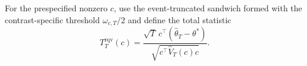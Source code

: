 For the prespecified nonzero \(c\), use the event-truncated sandwich formed with the contrast-specific threshold \(\omega_{c,T}/2\) and define the total statistic
\[
 T_T^{\mathrm{rqv}}(c)=
 \frac{\sqrt T\,c^\top(\widehat\theta_T-\theta^*)}
 {\sqrt{c^\top\widehat V_T(c)c}}.
\]